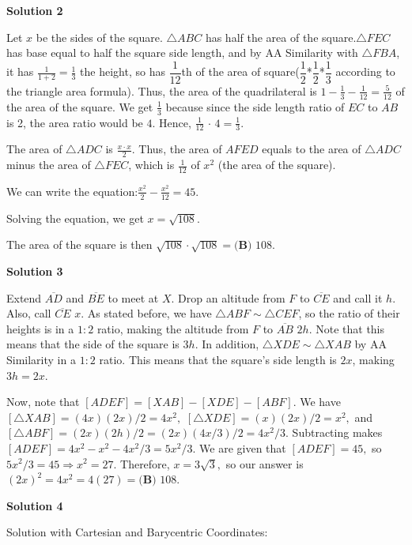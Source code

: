\begin{enumerate}
\textbf{Solution 2}

Let $x$ be the sides of the square. $\triangle ABC$ has half the area of the square.$\triangle FEC$ has base equal to half the square side length, and by AA Similarity with $\triangle FBA$, it has $\frac{1}{1+2}= \frac{1}{3}$ the height, so has $\dfrac1{12}$th of the area of square($\dfrac1{2}$*$\dfrac1{2}$*$\dfrac1{3}$ according to the triangle area formula). Thus, the area of the quadrilateral is $1-\frac{1}{3}-\frac{1}{12}=\frac{5}{12}$ of the area of the square. We get $\frac{1}{3}$ because since the side length ratio of $EC$ to $AB$ is 2, the area ratio would be $4$. Hence, $\frac{1}{12}$ $\cdot$ $4 = \frac{1}{3}.$ 

 The area of $\triangle ADC$ is $\frac{x \cdot x}{2}.$ Thus, the area of $AFED$ equals to the area of $\triangle ADC$ minus the area of $\triangle FEC$, which is $\frac{1}{12}$ of $x^2$ (the area of the square).

 We can write the equation:$\frac{x^2}{2} - \frac{x^2}{12} = 45.$

 Solving the equation, we get $x=\sqrt{108}.$

 The area of the square is then $\sqrt{108} \cdot \sqrt{108} =\boxed{\textbf{(B) } 108}$.

 



\textbf{Solution 3}

Extend $\overline{AD}$ and $\overline{BE}$ to meet at $X$. Drop an altitude from $F$ to $\overline{CE}$ and call it $h$. Also, call $\overline{CE}$ $x$. As stated before, we have $\triangle ABF \sim \triangle CEF$, so the ratio of their heights is in a $1:2$ ratio, making the altitude from $F$ to $\overline{AB}$ $2h$. Note that this means that the side of the square is $3h$. In addition, $\triangle XDE \sim \triangle XAB$ by AA Similarity in a $1:2$ ratio. This means that the square's side length is $2x$, making $3h=2x$.

 Now, note that $[ADEF]=[XAB]-[XDE]-[ABF]$. We have $[\triangle XAB]=(4x)(2x)/2=4x^2,$ $[\triangle XDE]=(x)(2x)/2=x^2,$ and $[\triangle ABF]=(2x)(2h)/2=(2x)(4x/3)/2=4x^2/3.$ Subtracting makes $[ADEF]=4x^2-x^2-4x^2/3=5x^2/3.$ We are given that $[ADEF]=45,$ so $5x^2/3=45 \Rightarrow x^2=27.$ Therefore, $x= 3 \sqrt{3},$ so our answer is $(2x)^2=4x^2=4(27)=\boxed{\textbf{(B) }108}.$




\textbf{Solution 4}

Solution with Cartesian and Barycentric Coordinates:


\end{enumerate}
